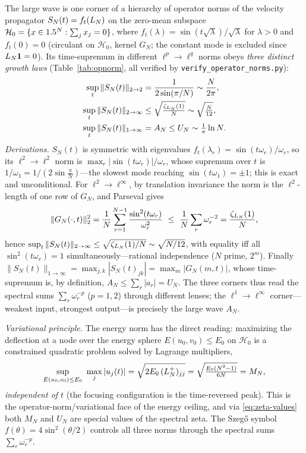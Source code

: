 The large wave is one corner of a hierarchy of operator norms of the velocity propagator
$S_N(t)=f_t(L_N)$ on the zero-mean subspace $\mathcal H_0=\{x\in1.5^N:\sum_jx_j=0\}$, where
$f_t(\lambda)=\sin(t\sqrt\lambda)/\sqrt\lambda$ for $\lambda>0$ and $f_t(0)=0$ (circulant on
$\mathcal H_0$, kernel $G_N$; the constant mode is excluded since $L_N\mathbf1=0$). Its time-supremum in
different $\ell^p\to\ell^q$ norms obeys \emph{three distinct growth laws} (Table~\ref{tab:opnorm}, all
verified by \texttt{verify\_operator\_norms.py}):
\begin{equation}\label{eq:opnorm}
\begin{aligned}
  \sup_t\|S_N(t)\|_{2\to2}&=\frac1{2\sin(\pi/N)}\sim\frac{N}{2\pi},\\
  \sup_t\|S_N(t)\|_{2\to\infty}&\le\sqrt{\tfrac{\zeta_{L_N}(1)}{N}}\sim\sqrt{\tfrac N{12}},\\
  \sup_t\|S_N(t)\|_{1\to\infty}&=A_N\le U_N\sim\tfrac1\pi\ln N .
\end{aligned}
\end{equation}
\emph{Derivations.} $S_N(t)$ is symmetric with eigenvalues $f_t(\lambda_r)=\sin(t\omega_r)/\omega_r$, so
its $\ell^2\!\to\!\ell^2$ norm is $\max_r|\sin(t\omega_r)|/\omega_r$, whose supremum over $t$ is
$1/\omega_1=1/(2\sin\tfrac\pi N)$---the slowest mode reaching $\sin(t\omega_1)=\pm1$; this is exact and
unconditional. For $\ell^2\!\to\!\ell^\infty$, by translation invariance the norm is the $\ell^2$-length
of one row of $G_N$, and Parseval gives
\[
  \|G_N(\cdot,t)\|_2^2=\frac1N\sum_{r=1}^{N-1}\frac{\sin^2(t\omega_r)}{\omega_r^2}
  \ \le\ \frac1N\sum_{r}\omega_r^{-2}=\frac{\zeta_{L_N}(1)}N,
\]
hence $\sup_t\|S_N(t)\|_{2\to\infty}\le\sqrt{\zeta_{L_N}(1)/N}\sim\sqrt{N/12}$, with equality iff all
$\sin^2(t\omega_r)=1$ simultaneously---rational independence ($N$ prime, $2^m$). Finally
$\|S_N(t)\|_{1\to\infty}=\max_{j,k}|S_N(t)_{jk}|=\max_m|G_N(m,t)|$, whose time-supremum is, by definition,
$A_N\le\sum_r|a_r|=U_N$. The three corners thus read the spectral sums $\sum_r\omega_r^{-p}$ ($p=1,2$)
through different lenses; the $\ell^1\!\to\!\ell^\infty$ corner---weakest input, strongest output---is
precisely the large wave $A_N$.

\emph{Variational principle.} The energy norm has the direct reading: maximizing the deflection at a
node over the energy sphere $E(u_0,v_0)\le E_0$ on $\mathcal H_0$ is a constrained quadratic problem solved by Lagrange
multipliers,
\[
  \sup_{E(u_0,v_0)\le E_0}\ \max_j|u_j(t)| = \sqrt{2E_0\,(L_N^{+})_{jj}}=\sqrt{\tfrac{E_0(N^2-1)}{6N}}=M_N,
\]
\emph{independent of $t$} (the focusing configuration is the time-reversed peak). This is the
operator-norm/variational face of the energy ceiling, and via \eqref{eq:zeta-values} both $M_N$ and
$U_N$ are special values of the spectral zeta. The Szeg\H{o} symbol $f(\theta)=4\sin^2(\theta/2)$
controls all three norms through the spectral sums $\sum_r\omega_r^{-p}$.

